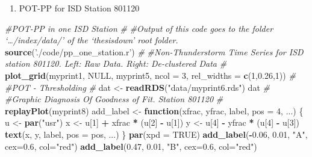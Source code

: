 \documentclass[12pt,oneside]{reedthesis}
\newenvironment{Shaded}{\begin{snugshade}}{\end{snugshade}}
\newcommand{\CommentTok}[1]{\textcolor[rgb]{0.56,0.35,0.01}{\textit{#1}}}
\newcommand{\ControlFlowTok}[1]{\textcolor[rgb]{0.13,0.29,0.53}{\textbf{#1}}}
\newcommand{\DataTypeTok}[1]{\textcolor[rgb]{0.13,0.29,0.53}{#1}}
\newcommand{\DecValTok}[1]{\textcolor[rgb]{0.00,0.00,0.81}{#1}}
\newcommand{\FloatTok}[1]{\textcolor[rgb]{0.00,0.00,0.81}{#1}}
\newcommand{\KeywordTok}[1]{\textcolor[rgb]{0.13,0.29,0.53}{\textbf{#1}}}
\newcommand{\NormalTok}[1]{#1}
\newcommand{\OperatorTok}[1]{\textcolor[rgb]{0.81,0.36,0.00}{\textbf{#1}}}
\newcommand{\OtherTok}[1]{\textcolor[rgb]{0.56,0.35,0.01}{#1}}
\newcommand{\StringTok}[1]{\textcolor[rgb]{0.31,0.60,0.02}{#1}}
\providecommand{\tightlist}{%
  \setlength{\itemsep}{0pt}\setlength{\parskip}{0pt}}
\begin{document}
\normalsize
\begin{enumerate}
\def\labelenumi{\arabic{enumi}.}
\setcounter{enumi}{2}
\tightlist
\item
  POT-PP for ISD Station 801120
\end{enumerate}
\tiny
\begin{Shaded}
\begin{Highlighting}[]
\CommentTok{#POT-PP in one ISD Station}
\CommentTok{#}
\CommentTok{#Output of this code goes to the folder ‘…/index/data/’ of the ‘thesisdown’ root folder.}
\KeywordTok{source}\NormalTok{(}\StringTok{'./code/pp_one_station.r'}\NormalTok{)}
\CommentTok{#}
\CommentTok{#Non-Thunderstorm Time Series for ISD station 801120. Left: Raw Data. Right: De-clustered Data}
\CommentTok{#}
\KeywordTok{plot_grid}\NormalTok{(myprint1, }\OtherTok{NULL}\NormalTok{, myprint5, }\DataTypeTok{ncol =} \DecValTok{3}\NormalTok{,  }\DataTypeTok{rel_widths =} \KeywordTok{c}\NormalTok{(}\DecValTok{1}\NormalTok{,}\FloatTok{0.26}\NormalTok{,}\DecValTok{1}\NormalTok{))}
\CommentTok{#}
\CommentTok{#POT - Thresholding}
\CommentTok{#}
\NormalTok{dat <-}\StringTok{ }\KeywordTok{readRDS}\NormalTok{(}\StringTok{"data/myprint6.rds"}\NormalTok{)}
\NormalTok{dat}
\CommentTok{#}
\CommentTok{#Graphic Diagnosis Of Goodness of Fit. Station 801120}
\CommentTok{#}
\KeywordTok{replayPlot}\NormalTok{(myprint8)}
\NormalTok{add_label <-}\StringTok{ }\ControlFlowTok{function}\NormalTok{(xfrac, yfrac, label, }\DataTypeTok{pos =} \DecValTok{4}\NormalTok{, ...) \{}
\NormalTok{  u <-}\StringTok{ }\KeywordTok{par}\NormalTok{(}\StringTok{"usr"}\NormalTok{)}
\NormalTok{  x <-}\StringTok{ }\NormalTok{u[}\DecValTok{1}\NormalTok{] }\OperatorTok{+}\StringTok{ }\NormalTok{xfrac }\OperatorTok{*}\StringTok{ }\NormalTok{(u[}\DecValTok{2}\NormalTok{] }\OperatorTok{-}\StringTok{ }\NormalTok{u[}\DecValTok{1}\NormalTok{])}
\NormalTok{  y <-}\StringTok{ }\NormalTok{u[}\DecValTok{4}\NormalTok{] }\OperatorTok{-}\StringTok{ }\NormalTok{yfrac }\OperatorTok{*}\StringTok{ }\NormalTok{(u[}\DecValTok{4}\NormalTok{] }\OperatorTok{-}\StringTok{ }\NormalTok{u[}\DecValTok{3}\NormalTok{])}
  \KeywordTok{text}\NormalTok{(x, y, label, }\DataTypeTok{pos =}\NormalTok{ pos, ...)}
\NormalTok{\}}
\KeywordTok{par}\NormalTok{(}\DataTypeTok{xpd =} \OtherTok{TRUE}\NormalTok{)}
\KeywordTok{add_label}\NormalTok{(}\OperatorTok{-}\FloatTok{0.06}\NormalTok{, }\FloatTok{0.01}\NormalTok{, }\StringTok{"A"}\NormalTok{, }\DataTypeTok{cex=}\FloatTok{0.6}\NormalTok{, }\DataTypeTok{col=}\StringTok{"red"}\NormalTok{)}
\KeywordTok{add_label}\NormalTok{(}\FloatTok{0.47}\NormalTok{, }\FloatTok{0.01}\NormalTok{, }\StringTok{"B"}\NormalTok{, }\DataTypeTok{cex=}\FloatTok{0.6}\NormalTok{, }\DataTypeTok{col=}\StringTok{"red"}\NormalTok{)}

\end{Highlighting}
\end{Shaded}
\end{document}
